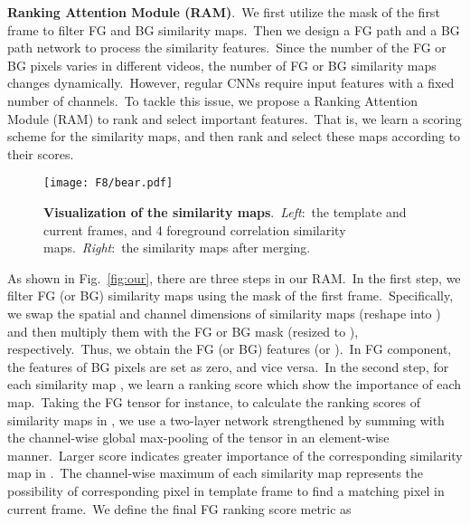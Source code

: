 \documentclass[10pt,twocolumn,letterpaper]{article}
\begin{document}
\noindent
\textbf{Ranking Attention Module (RAM)}.\
We first utilize the mask of the first frame to filter FG and BG similarity maps.\ Then we design a FG path and a BG path network to process the similarity features.\ Since the number of the FG or BG pixels varies in different videos, the number of FG or BG similarity maps changes dynamically.\ However, regular CNNs require input features with a fixed number of channels.\ 
To tackle this issue, we propose a Ranking Attention Module (RAM) to rank and select important features.\ That is, we learn a scoring scheme for the similarity maps, and then rank and select these maps according to their scores.\ 





\begin{figure}
\begin{center}
\vspace{-5mm}
\texttt{[image: F8/bear.pdf]}
\end{center}
\vspace{-6mm}
\caption{\textbf{Visualization of the similarity maps}.\ \textsl{Left}:\ the template and current frames, and 4 foreground correlation similarity maps.\ \textsl{Right}:\ the similarity maps after merging.}
\vspace{-5mm}
\label{fig:visual}
\end{figure}

As shown in Fig.~\ref{fig:our}, there are three steps in our RAM.\ In the first step, we filter FG (or BG) similarity maps using the mask of the first frame.\ Specifically, we swap the spatial and channel dimensions of similarity maps (reshape  into ) and then multiply them with the FG or BG mask (resized to ), respectively.\ Thus, we obtain the FG (or BG) features  (or ).\ In FG component, the features of BG pixels are set as zero, and vice versa.\ 
In the second step, for each similarity map , we learn a ranking score  which show the importance of each map.\ Taking the FG tensor  for instance, to calculate the ranking scores of similarity maps in , we use a two-layer network  strengthened by summing with the channel-wise global max-pooling  of the tensor  in an element-wise manner.\ Larger score indicates greater importance of the corresponding similarity map in .\ The channel-wise maximum of each similarity map represents the possibility of corresponding pixel in template frame to find a matching pixel in current frame.\ We define the final FG ranking score metric  as
\end{document}
